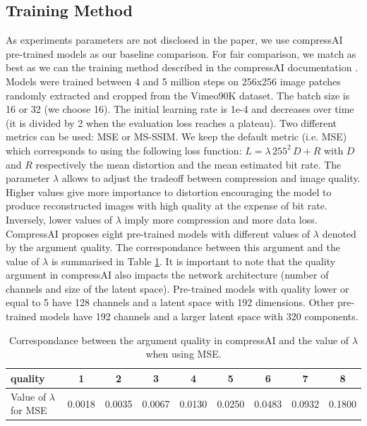 \subsection{Training Method}
\label{training_method}
As experiments parameters are not disclosed in the paper, we use compressAI pre-trained models as our baseline comparison. For fair comparison, we match as best as we can the training method described in the compressAI documentation \cite{compressai_train}. Models were trained between 4 and 5 million steps on 256x256 image patches randomly extracted and cropped from the Vimeo90K dataset. The batch size is 16 or 32 (we choose 16). The initial learning rate is 1e-4 and decreases over time (it is divided by 2 when the evaluation loss reaches a plateau). Two different metrics can be used: MSE or MS-SSIM. We keep the default metric (i.e. MSE) which corresponds to using the following loss function: \(L = \lambda\, 255^{2}\, D + R\) with \(D\) and \(R\) respectively the mean distortion and the mean estimated bit rate. The parameter \(\lambda\) allows to adjust the tradeoff between compression and image quality. Higher values give more importance to distortion encouraging the model to produce reconstructed images with high quality at the expense of bit rate. Inversely, lower values of \(\lambda\) imply more compression and more data loss. CompressAI proposes eight pre-trained models with different values of \(\lambda\) denoted by the argument \textsf{quality}. The correspondance between this argument and the value of \(\lambda\) is summarised in Table \ref{tab_quality_lambda}. It is important to note that the \textsf{quality} argument in compressAI also impacts the network architecture (number of channels and size of the latent space). Pre-trained models with \textsf{quality} lower or equal to 5 have 128 channels and a latent space with 192 dimensions. Other pre-trained models have 192 channels and a larger latent space with 320 components. 

\begin{table}[]
    \centering
    \caption{Correspondance between the argument \textsf{quality} in compressAI and the value of \(\lambda\) when using MSE.}
    \label{tab_quality_lambda}
    \begin{tabular}{|l|c|c|c|c|c|c|c|c|}
    \hline
    \textsf{quality}             & 1 & 2 & 3 & 4 & 5 & 6 & 7 & 8 \\ \hline
    Value of \(\lambda\) for MSE & 0.0018 & 0.0035 & 0.0067 & 0.0130 & 0.0250 & 0.0483 & 0.0932 & 0.1800 \\ \hline
    \end{tabular}
\end{table}

